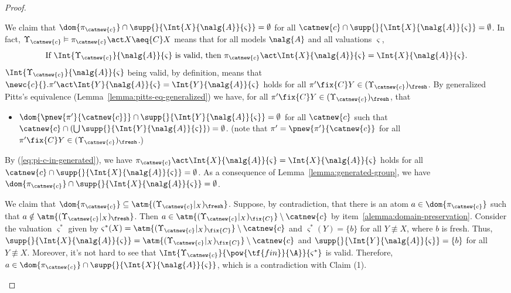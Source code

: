 \begin{proof}
\begin{enumerate}
        \begin{claim}[1]
            We claim that $\dom{\pi_{\catnew{c}}}\cap \supp{}{\Int{X}{\nalg{A}}{\varsigma}} = \emptyset$ for all $\catnew{c}\cap \supp{}{\Int{X}{\nalg{A}}{\varsigma}} = \emptyset$. In fact, $\Upsilon_{\catnew{c}} \vDash \pi_{\catnew{c}}\act X \aeq{C} X$ means that for all models $\nalg{A}$ and all valuations $\varsigma$,
        \begin{equation}\label{eq:pi-c-in-generated}
            \text{If $\Int{\Upsilon_{\catnew{c}}}{\nalg{A}}{\varsigma}$ is valid, then $\pi_{\catnew{c}}\act \Int{X}{\nalg{A}}{\varsigma} = \Int{X}{\nalg{A}}{\varsigma}$.}
        \end{equation}
        $\Int{\Upsilon_{\catnew{c}}}{\nalg{A}}{\varsigma}$ being valid, by definition, means that $\newc{c}{}. \pi'\act \Int{Y}{\nalg{A}}{\varsigma} = \Int{Y}{\nalg{A}}{\varsigma}$ holds for all $\pi'\fix{C} Y\in (\Upsilon_{\catnew{c}})_{\fresh}$. By generalized Pitts's equivalence (Lemma~\ref{lemma:pitts-eq-generalized}) we have, for all $\pi'\fix{C} Y\in (\Upsilon_{\catnew{c}})_{\fresh}$, that
        \begin{itemize}
            \item $\dom{\pnew{\pi'}{\catnew{c}}}\cap \supp{}{\Int{Y}{\nalg{A}}{\varsigma}} = \emptyset$ for all $\catnew{c}$ such that $\catnew{c}\cap(\bigcup\supp{}{\Int{Y}{\nalg{A}}{\varsigma}}) = \emptyset$. (note that $\pi' = \pnew{\pi'}{\catnew{c}}$ for all $\pi'\fix{C} Y\in (\Upsilon_{\catnew{c}})_{\fresh}$.)
        \end{itemize}
        By (\ref{eq:pi-c-in-generated}), we have $\pi_{\catnew{c}}\act \Int{X}{\nalg{A}}{\varsigma} = \Int{X}{\nalg{A}}{\varsigma}$ holds for all $\catnew{c}\cap\supp{}{\Int{X}{\nalg{A}}{\varsigma}} = \emptyset$. As a consequence of Lemma~\ref{lemma:generated-group}, we have $\dom{\pi_{\catnew{c}}}\cap \supp{}{\Int{X}{\nalg{A}}{\varsigma}} = \emptyset$.
        \end{claim}

        \begin{claim}[2]
            We claim that  $\dom{\pi_{\catnew{c}}}\subseteq \atm{(\Upsilon_{\catnew{c}}|_X)_{\fresh}}$.  Suppose, by contradiction, that there is an atom $a\in \dom{\pi_{\catnew{c}}}$ such that $a\notin \atm{(\Upsilon_{\catnew{c}}|_X)_{\fresh}}$. Then $a\in \atm{(\Upsilon_{\catnew{c}}|_X)_{\fix{C}}}\setminus{\catnew{c}}$ by item~\ref{alemma:domain-preservation}. Consider the valuation $\varsigma^*$ given by $\varsigma^*(X) = \atm{(\Upsilon_{\catnew{c}}|_X)_{\fix{C}}}\setminus{\catnew{c}}$ and $\varsigma^*(Y) = \{b\}$ for all $Y\not\equiv X$, where $b$ is fresh. Thus, $\supp{}{\Int{X}{\nalg{A}}{\varsigma}} = \atm{(\Upsilon_{\catnew{c}}|_X)_{\fix{C}}}\setminus{\catnew{c}}$ and $\supp{}{\Int{Y}{\nalg{A}}{\varsigma}} = \{b\}$ for all $Y\not\equiv X$. Moreover, it's not hard to see that $\Int{\Upsilon_{\catnew{c}}}{\pow{\tf{fin}}{\A}}{\varsigma^*}$ is valid. Therefore, $a \in \dom{\pi_{\catnew{c}}}\cap \supp{}{\Int{X}{\nalg{A}}{\varsigma}}$, which is a contradiction with Claim (1).
        \end{claim}



\end{enumerate}
\end{proof}
